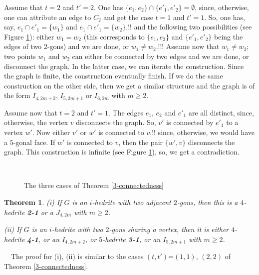 \documentclass[12pt]{article}
\newtheorem{theorem}{Theorem}
\newcommand{\proof}{\noindent{\bf Proof.}\ \ }
\begin{document}
Assume that $t=2$ and $t'=2$. One has $\{e_1, e_2\}\cap \{e'_1, e'_2\}=\emptyset$, since, otherwise, one can attribute an edge to $C_2$ and get the case
$t=1$ and $t'=1$. So, one has, say, $e_1\cap e'_1=\{w_1\}$ and 
$e_1\cap e'_1=\{w_2\}$,!! and the following two possibilities 
(see Figure \ref{fig:TheThreeCases}): either $w_1=w_2$ (this
corresponds to $\{e_1, e_2\}$ and $\{e'_1, e'_2\}$ being the edges
of two $2$-gons) and we are done, or $w_1\not= w_2$.!!!
Assume now that $w_1\not= w_2$; two points $w_1$ and $w_2$ can 
either be connected by two edges and we are done, or disconnect the
graph. In the latter case, we can iterate the construction. Since the 
graph is finite, the construction eventually finish. If we do the same
construction on the other side, then we get a similar structure and the 
graph is of the form $I_{4,2m+2}$, $I_{5, 2m+1}$ or $I_{6,2m}$ with 
$m\geq 2$.


Assume now that $t=2$ and $t'=1$. The edges $e_1$, $e_2$ and $e'_1$ are
all distinct, since, otherwise, the vertex $v$ disconnects the graph.
So, $v'$ is connected by $e'_1$ to a vertex $w'$. Now either $v'$ or $w'$
is connected to $v$,!! since, otherwise, we would have a $5$-gonal face.
If $w'$ is connected to $v$, then the pair $\{w', v\}$ disconnects the graph.
This construction is infinite (see Figure \ref{fig:TheThreeCases}), so,
we get a contradiction.




\begin{figure}
\centering
\mbox{
}
\caption{The three cases of Theorem \ref{3-connectedness}}
\label{fig:TheThreeCases}
\end{figure}



\begin{theorem}
(i) If $G$ is an $i$-hedrite with two adjacent $2$-gons, then 
this is a $4$-hedrite {\bf 2-1} or a $J_{4,2m}$ with $m\geq 2$.

(ii) If $G$ is an $i$-hedrite with two $2$-gons sharing a vertex, then 
it is either $4$-hedrite {\bf 4-1}, or an $I_{4,2m+2}$, or $5$-hedrite 
{\bf 3-1}, or an $I_{5,2m+1}$ with $m\geq 2$.

\end{theorem}

\proof The proof for (i), (ii) is similar to the cases $(t,t')$=$(1,1)$, $(2,2)$ of Theorem \ref{3-connectedness}.
\end{document}
